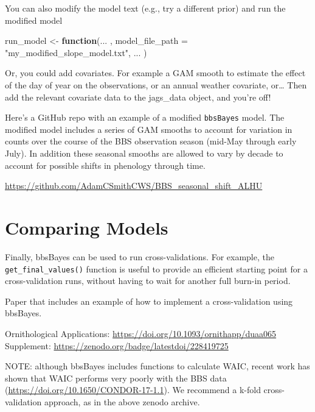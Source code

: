 \documentclass[
]{book}
\newenvironment{Shaded}{\begin{snugshade}}{\end{snugshade}}
\newcommand{\AttributeTok}[1]{\textcolor[rgb]{0.77,0.63,0.00}{#1}}
\newcommand{\ControlFlowTok}[1]{\textcolor[rgb]{0.13,0.29,0.53}{\textbf{#1}}}
\newcommand{\NormalTok}[1]{#1}
\newcommand{\OtherTok}[1]{\textcolor[rgb]{0.56,0.35,0.01}{#1}}
\newcommand{\StringTok}[1]{\textcolor[rgb]{0.31,0.60,0.02}{#1}}
\begin{document}
You can also modify the model text (e.g., try a different prior) and run the modified model

\begin{Shaded}
\begin{Highlighting}[]
\NormalTok{run\_model }\OtherTok{\textless{}{-}} \ControlFlowTok{function}\NormalTok{(... ,}
                      \AttributeTok{model\_file\_path =} \StringTok{"my\_modified\_slope\_model.txt"}\NormalTok{,}
\NormalTok{                      ... )}
\end{Highlighting}
\end{Shaded}

Or, you could add covariates.
For example a GAM smooth to estimate the effect of the day of year on the observations, or an annual weather covariate, or\ldots{} Then add the relevant covariate data to the jags\_data object, and you're off!

Here's a GitHub repo with an example of a modified \texttt{bbsBayes} model. The modified model includes a series of GAM smooths to account for variation in counts over the course of the BBS observation season (mid-May through early July). In addition these seasonal smooths are allowed to vary by decade to account for possible shifts in phenology through time.

\url{https://github.com/AdamCSmithCWS/BBS_seasonal_shift_ALHU}

\hypertarget{comparing-models}{%
\section{Comparing Models}\label{comparing-models}}

Finally, bbsBayes can be used to run cross-validations. For example, the \texttt{get\_final\_values()} function is useful to provide an efficient starting point for a cross-validation runs, without having to wait for another full burn-in period.

Paper that includes an example of how to implement a cross-validation using bbsBayes.

Ornithological Applications: \url{https://doi.org/10.1093/ornithapp/duaa065}
Supplement: \url{https://zenodo.org/badge/latestdoi/228419725}

NOTE: although bbsBayes includes functions to calculate WAIC, recent work has shown that WAIC performs very poorly with the BBS data (\url{https://doi.org/10.1650/CONDOR-17-1.1}). We recommend a k-fold cross-validation approach, as in the above zenodo archive.
\end{document}
